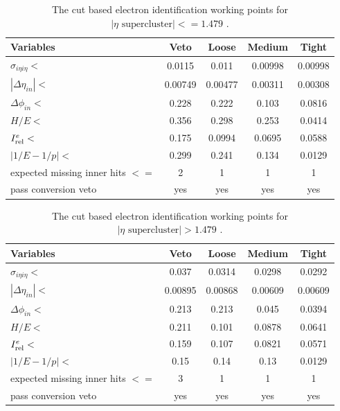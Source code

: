 \begin{table}
\centering
\begin{tabular}[!htbp]{l c c c c}
\hline
{\textbf{Variables}} & {\textbf{Veto}} & \textbf{Loose} & \textbf{Medium} &  \textbf{Tight} \\
\hline
$\sigma_{i\eta i\eta} < $ & 0.0115  & 0.011   & 0.00998 & 0.00998 \\
$|\Delta \eta_{in}| < $   & 0.00749 & 0.00477 & 0.00311 & 0.00308 \\
$\Delta \phi_{in} < $     & 0.228   & 0.222   & 0.103   & 0.0816  \\
$H/E < $                  & 0.356   & 0.298   & 0.253   & 0.0414  \\
$I^{e}_{\rm rel} < $      & 0.175   & 0.0994  & 0.0695  & 0.0588  \\
$|1/E - 1/p| < $          & 0.299   & 0.241   & 0.134   & 0.0129  \\
expected missing inner hits $<=$ & 2  & 1   &   1   &   1 \\
pass conversion veto      & yes   & yes & yes & yes \\
\hline
\end{tabular}
\caption{The cut based electron identification working points for $|\eta \text{ supercluster}| <= 1.479$ .}
\label{table:electron-identification}
\end{table}
\begin{table}
\centering
\begin{tabular}[!htbp]{l c c c c}
\hline
{\textbf{Variables}} & {\textbf{Veto}} & \textbf{Loose} & \textbf{Medium} &  \textbf{Tight} \\
\hline
$\sigma_{i\eta i\eta} < $ & 0.037   & 0.0314 & 0.0298 & 0.0292    \\
$|\Delta \eta_{in}| < $   & 0.00895 & 0.00868& 0.00609& 0.00609   \\
$\Delta \phi_{in} < $     & 0.213   & 0.213  & 0.045  & 0.0394    \\
$H/E < $                  & 0.211   & 0.101  & 0.0878 & 0.0641    \\
$I^{e}_{\rm rel} < $      & 0.159   & 0.107  & 0.0821 & 0.0571   \\
$|1/E - 1/p| < $          & 0.15    & 0.14   & 0.13   & 0.0129    \\
expected missing inner hits $<=$ & 3& 1   &   1   &   1 \\
pass conversion veto      & yes     & yes & yes & yes \\
\hline
\end{tabular}
\caption{The cut based electron identification working points for $|\eta \text{ supercluster}| > 1.479$ .}
\label{table:electron-identification-2}
\end{table}

